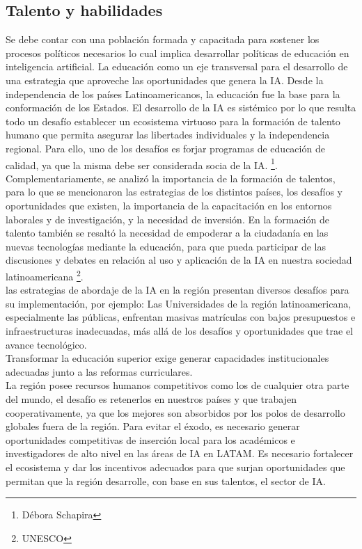 \documentclass[10pt]{book}
\begin{document}
\begin{multicols}{2}
\section*{Talento y habilidades}
Se debe contar con una población formada y capacitada para sostener los procesos políticos necesarios lo cual implica desarrollar políticas de educación en inteligencia artificial. La educación como un eje transversal para el desarrollo de una estrategia que aproveche las oportunidades que genera la IA. Desde la independencia de los países Latinoamericanos, la educación fue la base para la conformación de los Estados. El desarrollo de la IA es sistémico por lo que resulta todo un desafío establecer un ecosistema virtuoso para la formación de talento humano que permita asegurar las libertades individuales y la independencia regional. Para ello, uno de los desafíos es forjar programas de educación de calidad, ya que la misma debe ser considerada socia de la IA. \footnote{Débora Schapira}.\\
Complementariamente, se analizó la importancia de la formación de talentos, para lo que se mencionaron las estrategias de los distintos países, los desafíos y oportunidades que existen, la importancia de la capacitación en los entornos laborales y de investigación, y la necesidad de inversión. En la formación de talento también se resaltó la necesidad de empoderar a la ciudadanía en las nuevas tecnologías mediante la educación, para que pueda participar de las discusiones y debates en relación al uso y aplicación de la IA en nuestra sociedad latinoamericana \footnote{UNESCO}.\\
las estrategias de abordaje de la IA en la región presentan diversos desafíos para su implementación, por ejemplo: Las Universidades de la región latinoamericana, especialmente las públicas, enfrentan masivas matrículas con bajos presupuestos e infraestructuras inadecuadas, más allá de los desafíos y oportunidades que trae el avance tecnológico.\\
Transformar la educación superior exige generar capacidades institucionales adecuadas junto a las reformas curriculares.\\
La región posee recursos humanos competitivos como los de cualquier otra parte del mundo, el desafío es retenerlos en nuestros países y que trabajen cooperativamente, ya que los mejores son absorbidos por los polos de desarrollo globales fuera de la región. Para evitar el éxodo, es necesario generar oportunidades competitivas de inserción local para los académicos e investigadores de alto nivel en las áreas de IA en LATAM. Es necesario fortalecer el ecosistema y dar los incentivos adecuados para que surjan oportunidades que permitan que la región desarrolle, con base en sus talentos, el sector de IA.\\

\end{multicols}
\end{document}
